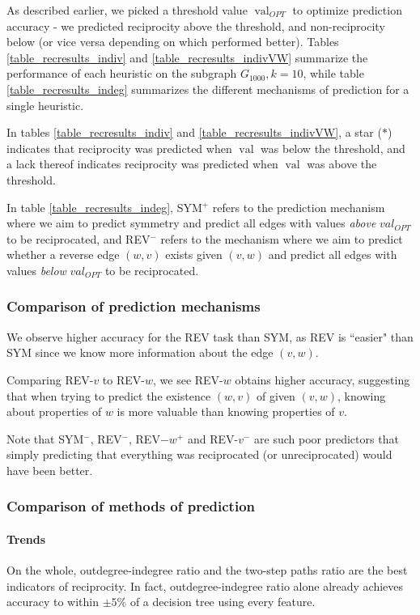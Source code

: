 \documentclass[conference]{IEEEtran}
\begin{document}
As described earlier, we picked a threshold value $\operatorname{val}_{OPT}$ to optimize prediction accuracy - we predicted reciprocity above the threshold, and non-reciprocity below (or vice versa depending on which performed better). 
Tables \ref{table_recresults_indiv} and \ref{table_recresults_indivVW} summarize the performance of each heuristic on the subgraph $G_{1000}, k=10$, while 
table \ref{table_recresults_indeg} summarizes the different mechanisms of prediction for a single heuristic.

In tables \ref{table_recresults_indiv} and \ref{table_recresults_indivVW}, a star ($*$) indicates that reciprocity was predicted when $\operatorname{val}$ was below the threshold, and a lack thereof indicates reciprocity was predicted when $\operatorname{val}$ was above the threshold.

In table \ref{table_recresults_indeg}, SYM$^+$ refers to the prediction mechanism where we aim to predict symmetry and predict all edges with values \emph{above} $val_{OPT}$ to be reciprocated, and REV$^-$ refers to the mechanism where we aim to predict whether a reverse edge $(w,v)$ exists given $(v,w)$ and predict all edges with values \emph{below} $val_{OPT}$ to be reciprocated. 

\subsubsection{Comparison of prediction mechanisms}
We observe higher accuracy for the REV task than SYM, as REV is ``easier" than SYM 
since we know more information about the edge $(v,w)$.

Comparing REV-$v$ to REV-$w$, we see REV-$w$ obtains higher accuracy, suggesting that when trying to predict the existence $(w,v)$ of given $(v,w)$, knowing about properties of $w$ is more valuable than knowing properties of $v$.

Note that SYM$^-$, REV$^-$, REV$-w^+$ and REV-$v^-$ are such poor predictors that simply predicting that everything was reciprocated (or unreciprocated) would have been better.

\subsubsection{Comparison of methods of prediction}

\paragraph{Trends}
On the whole, outdegree-indegree ratio and the two-step paths ratio are the best indicators of reciprocity. 
In fact, outdegree-indegree ratio alone already achieves accuracy to within $\pm 5\%$ of a decision tree using every feature.
\end{document}
